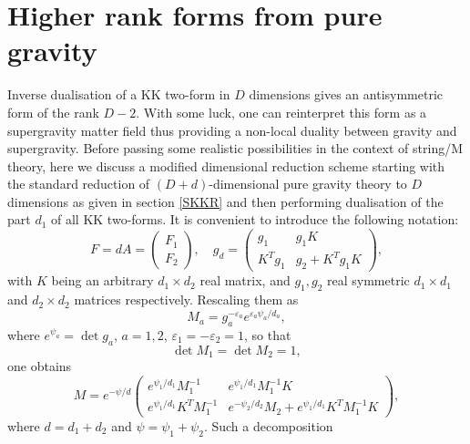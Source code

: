 \documentclass[a4paper,12pt]{article}
\begin{document}
\section{Higher rank forms from pure gravity}
Inverse dualisation of a KK two-form in $D$ dimensions gives an
antisymmetric form of the rank $D-2$. With some luck, one can
reinterpret this form as a supergravity matter field thus
providing a non-local duality between gravity and supergravity.
Before passing some realistic possibilities in the context of
string/M theory, here we discuss a modified dimensional
reduction scheme starting with the standard reduction of
$(D+d)$-dimensional pure gravity theory to $D$ dimensions as
given in section \ref{SKKR} and then performing dualisation of
the part $d_1$ of all KK two-forms. It is convenient to
introduce the following notation:
\begin{equation}\label{Fg}
F = dA = \left( \begin{array}{c} F_1 \\ F_2 \end{array} \right),
\quad g_{d} = \left( \begin{array}{cc} g_1 & g_1 K \\
K^T g_1 & g_2 + K^T g_1 K \end{array} \right),
\end{equation}
with $K$ being an arbitrary $d_1 \times d_2$ real matrix, and
$g_1, g_2$ real symmetric $d_1 \times d_1$ and $d_2 \times d_2$
matrices respectively. Rescaling them as
\begin{equation}
M_a = g_a^{-\varepsilon_a} e^{\varepsilon_a \psi_a/d_a},
\end{equation}
where $e^{\psi_a} = \det g_a$, $a=1,2$, $\varepsilon_1 =
-\varepsilon_2 = 1$, so that
\begin{equation}\label{M1M2}
\det M_1 = \det M_2 = 1,
\end{equation}
one obtains
\begin{equation}\label{mod2}
M = e^{-\psi/d} \left(\begin{array}{cc}
  e^{\psi_1/d_1} M_1^{-1}      & e^{\psi_1/d_1} M_1^{-1} K\\
  e^{\psi_1/d_1} K^T M_1^{-1}  &
  e^{-\psi_2/d_2} M_2 + e^{\psi_1/d_1} K^T M_1^{-1} K
  \end{array} \right),
\end{equation}
where $d=d_1+d_2$ and $\psi=\psi_1+\psi_2$. Such a decomposition
\end{document}
